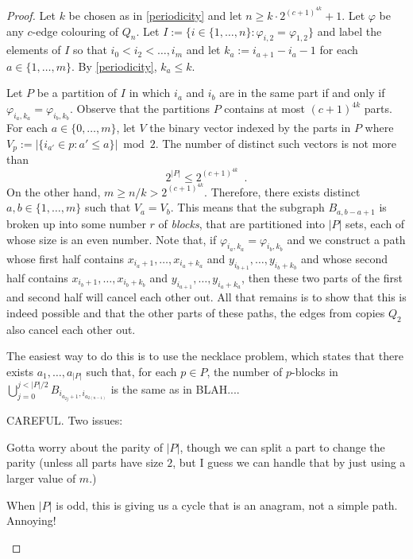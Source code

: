 \documentclass[kpfonts]{patmorin}
\begin{document}
\begin{proof}
    Let $k$ be chosen as in \cref{periodicity} and let $n\ge k\cdot 2^{(c+1)^{4k}}+1$.  Let $\varphi$ be any $c$-edge colouring of $Q_n$.  Let $I:=\{i\in\{1,\ldots,n\}:\varphi_{i,2}=\varphi_{1,2}\}$ and label the elements of $I$ so that $i_0<i_2<\ldots,i_m$ and let $k_a:=i_{a+1}-i_a-1$ for each $a\in\{1,\ldots,m\}$.  By \cref{periodicity}, $k_a\le k$.

    Let $P$ be a partition of $I$ in which $i_a$ and $i_b$ are in the same part if and only if $\varphi_{i_a,k_a}=\varphi_{i_b,k_b}$.  Observe that the partitions $P$ contains at most $(c+1)^{4k}$ parts.  For each $a\in\{0,\ldots,m\}$, let $V$ the binary vector indexed by the parts in $P$ where $V_p := |\{i_{a'}\in p: a'\le a\}|\bmod 2$.  The number of distinct such vectors is not more than
    \[
        2^{|P|} \le 2^{(c+1)^{4k}} \enspace .
    \]
    On the other hand, $m \ge n/k > 2^{(c+1)^{4k}}$.  Therefore, there exists distinct $a,b\in\{1,\ldots,m\}$ such that $V_a=V_b$.  This means that the subgraph $B_{a,b-a+1}$ is broken up into some number $r$ of \emph{blocks}, that are partitioned into $|P|$ sets, each of whose size is an even number.  Note that, if $\varphi_{i_a,k_a}=\varphi_{i_b,k_b}$ and we construct a path whose first half contains $x_{i_{a}+1},\ldots,x_{i_{a}+k_a}$ and $y_{i_{b+1}},\ldots,y_{i_{b}+k_b}$ and whose second half contains $x_{i_{b}+1},\ldots,x_{i_{b}+k_b}$ and $y_{i_{a+1}},\ldots,y_{i_{a}+k_a}$, then these two parts of the first and second half will cancel each other out.  All that remains is to show that this is indeed possible and that the other parts of these paths, the edges from copies $Q_2$ also cancel each other out.

    The easiest way to do this is to use the necklace problem, which states that there exists $a_1,\ldots,a_{|P|}$ such that, for each $p\in P$, the number of $p$-blocks in $\bigcup_{j=0}^{j<|P|/2} B_{i_{a_{2j}+1},i_{a_{2(n-1)}}}$ is the same as in BLAH....

    CAREFUL.  Two issues:
    \begin{compactenum}[(i)]
        \item Gotta worry about the parity of $|P|$, though we can split a part to change the parity (unless all parts have size $2$, but I guess we can handle that by just using a larger value of $m$.)
        \item When $|P|$ is odd, this is giving us a cycle that is an anagram, not a simple path.  Annoying!
    \end{compactenum}
\end{proof}
\end{document}
